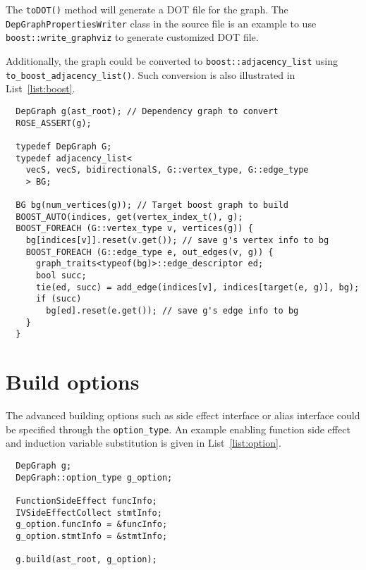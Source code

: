 \documentclass[preprint]{llncs}
\begin{document}
The \texttt{toDOT()} method will generate a DOT file for the graph.
The \texttt{DepGraphPropertiesWriter} class in the source file
  is an example to use \texttt{boost::write\_graphviz} to generate customized DOT file.

Additionally, the graph could be converted to \texttt{boost::adjacency\_list}
  using \texttt{to\_boost\_adjacency\_list()}.
Such conversion is also illustrated in List~\ref{list:boost}.

\begin{lstlisting}
  DepGraph g(ast_root); // Dependency graph to convert
  ROSE_ASSERT(g);

  typedef DepGraph G;
  typedef adjacency_list<
    vecS, vecS, bidirectionalS, G::vertex_type, G::edge_type
    > BG;

  BG bg(num_vertices(g)); // Target boost graph to build
  BOOST_AUTO(indices, get(vertex_index_t(), g);
  BOOST_FOREACH (G::vertex_type v, vertices(g)) {
    bg[indices[v]].reset(v.get()); // save g's vertex info to bg
    BOOST_FOREACH (G::edge_type e, out_edges(v, g)) {
      graph_traits<typeof(bg)>::edge_descriptor ed;
      bool succ;
      tie(ed, succ) = add_edge(indices[v], indices[target(e, g)], bg);
      if (succ)
        bg[ed].reset(e.get()); // save g's edge info to bg
    }
  }

\end{lstlisting}



%
\section{Build options}
\label{sec:option}
The advanced building options
  such as side effect interface or alias interface
  could be specified through the \texttt{option\_type}.
An example enabling function side effect and induction variable substitution
  is given in List~\ref{list:option}.

\begin{lstlisting}
  DepGraph g;
  DepGraph::option_type g_option;

  FunctionSideEffect funcInfo;
  IVSideEffectCollect stmtInfo;
  g_option.funcInfo = &funcInfo;
  g_option.stmtInfo = &stmtInfo;

  g.build(ast_root, g_option);
\end{lstlisting}
\end{document}
